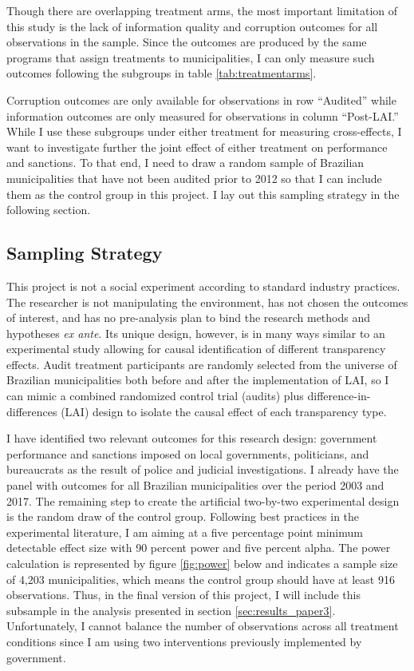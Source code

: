 \documentclass[11pt]{article}
\begin{document}
Though there are overlapping treatment arms, the most important limitation of this study is the lack of information quality and corruption outcomes for all observations in the sample. Since the outcomes are produced by the same programs that assign treatments to municipalities, I can only measure such outcomes following the subgroups in table \ref{tab:treatmentarms}.



Corruption outcomes are only available for observations in row ``Audited'' while information outcomes are only measured for observations in column ``Post-LAI.'' While I use these subgroups under either treatment for measuring cross-effects, I want to investigate further the joint effect of either treatment on performance and sanctions. To that end, I need to draw a random sample of Brazilian municipalities that have not been audited prior to 2012 so that I can include them as the control group in this project. I lay out this sampling strategy in the following section.

\subsection{Sampling Strategy} \label{sec:sampling_paper3}

This project is not a social experiment according to standard industry practices. The researcher is not manipulating the environment, has not chosen the outcomes of interest, and has no pre-analysis plan to bind the research methods and hypotheses \emph{ex ante}. Its unique design, however, is in many ways similar to an experimental study allowing for causal identification of different transparency effects. Audit treatment participants are randomly selected from the universe of Brazilian municipalities both before and after the implementation of LAI, so I can mimic a combined randomized control trial (audits) plus difference-in-differences (LAI) design to isolate the causal effect of each transparency type.

I have identified two relevant outcomes for this research design: government performance and sanctions imposed on local governments, politicians, and bureaucrats as the result of police and judicial investigations. I already have the panel with outcomes for all Brazilian municipalities over the period 2003 and 2017. The remaining step to create the artificial two-by-two experimental design is the random draw of the control group. Following best practices in the experimental literature, I am aiming at a five percentage point minimum detectable effect size with 90 percent power and five percent alpha. The power calculation is represented by figure \ref{fig:power} below and indicates a sample size of 4,203 municipalities, which means the control group should have at least 916 observations. Thus, in the final version of this project, I will include this subsample in the analysis presented in section \ref{sec:results_paper3}. Unfortunately, I cannot balance the number of observations across all treatment conditions since I am using two interventions previously implemented by government.
\end{document}
